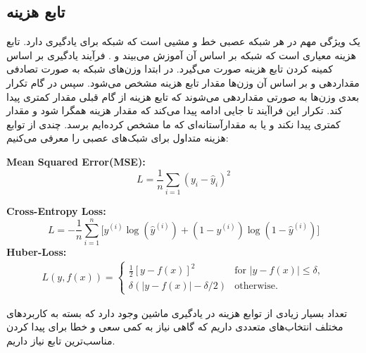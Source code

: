   \subsection{تابع هزینه}
  یک ویژگی مهم در هر شبکه عصبی خط و مشیی است که شبکه برای یادگیری دارد. تابع هزینه معیاری است که شبکه بر اساس آن آموزش می‌بیند و . فرآیند یادگیری بر اساس کمینه کردن تابع هزینه صورت می‌گیرد. در ابتدا وزن‌های شبکه به صورت تصادفی مقداردهی و بر اساس آن وزن‌ها مقدار تابع هزینه مشخص می‌شود. سپس در گام تکرار بعدی وزن‌ها به صورتی مقداردهی می‌شوند که تابع هزینه از گام قبلی مقدار کمتری پیدا کند. تکرار این فراآیند تا جایی ادامه پیدا می‌کند که مقدار هزینه همگرا شود و مقدار کمتری پیدا نکند و یا به مقدارآستانه‌ای که ما مشخص کرده‌ایم برسد. چندی از توابع هزینه متداول برای شبک‌های عصبی را معرفی می‌کنیم: 
  \begin{latin}
  	
  	\textbf{Mean Squared Error(MSE):}
  	\begin{equation}
  	L = \frac{1}{n} \sum_{i=1}{ (y_i - \hat{y}_i)^{2}}
  	\end{equation}
  	
  	\textbf{Cross-Entropy Loss:}
  	\begin{equation}
  	L =-\frac{1}{n}\sum_{i=1}^{n}\big[y^{(i)}\log(\hat{y}^{(i)})+(1-y^{(i)})\log(1-\hat{y}^{(i)})\big]
  	\label{CE_loss}
  	\end{equation}
  	\textbf{Huber-Loss:}
  	\begin{align}
  	L(y,f(x)) = \left\{ \begin{array}{cl}
  	\frac{1}{2} \left[y-f(x)\right]^2 & \text{for }|y-f(x)| \le \delta, \\
  	\delta \left(|y-f(x)|-\delta/2\right) & \text{otherwise.}
  	\end{array}\right.
  	\label{huber_loss}
  	\end{align}
  \end{latin}
  
  تعداد بسیار زیادی از توابع هزینه در یادگیری ماشین وجود دارد که بسته به کاربردهای مختلف انتخاب‌های متعددی داریم که گاهی نیاز به کمی سعی و خطا برای پیدا کردن مناسب‌ترین تابع نیاز داریم.
  
